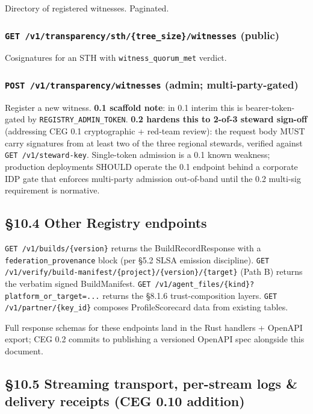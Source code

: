 \documentclass[10pt]{article}
\begin{document}
Directory of registered witnesses. Paginated.


\subsubsection*{\texttt{GET /v1/transparency/sth/\{tree\_size\}/witnesses} (public)}


Cosignatures for an STH with \texttt{witness\_quorum\_met} verdict.


\subsubsection*{\texttt{POST /v1/transparency/witnesses} (admin; multi-party-gated)}


Register a new witness. \textbf{0.1 scaffold note}: in 0.1 interim this is bearer-token-gated by \texttt{REGISTRY\_ADMIN\_TOKEN}. \textbf{0.2 hardens this to 2-of-3 steward sign-off} (addressing CEG 0.1 cryptographic + red-team review): the request body MUST carry signatures from at least two of the three regional stewards, verified against \texttt{GET /v1/steward-key}. Single-token admission is a 0.1 known weakness; production deployments SHOULD operate the 0.1 endpoint behind a corporate IDP gate that enforces multi-party admission out-of-band until the 0.2 multi-sig requirement is normative.


\subsection*{§10.4 Other Registry endpoints}


\texttt{GET /v1/builds/\{version\}} returns the BuildRecordResponse with a \texttt{federation\_provenance} block (per §5.2 SLSA emission discipline). \texttt{GET /v1/verify/build-manifest/\{project\}/\{version\}/\{target\}} (Path B) returns the verbatim signed BuildManifest. \texttt{GET /v1/agent\_files/\{kind\}?platform\_or\_target=...} returns the §8.1.6 trust-composition layers. \texttt{GET /v1/partner/\{key\_id\}} composes ProfileScorecard data from existing tables.


Full response schemas for these endpoints land in the Rust handlers + OpenAPI export; CEG 0.2 commits to publishing a versioned OpenAPI spec alongside this document.


\subsection*{§10.5 Streaming transport, per-stream logs \& delivery receipts (CEG 0.10 addition)}
\end{document}
